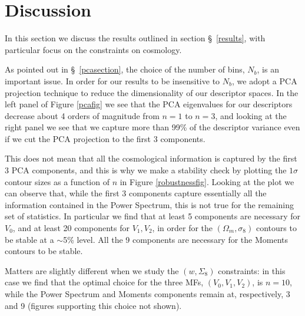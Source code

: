 \documentclass[reprint,aps,prd,superscriptaddress,showkeys,showpacs]{revtex4-1}
\begin{document}


\section{Discussion}
\label{discussion}

In this section we discuss the results outlined in section \S~\ref{results}, with particular focus on the constraints on cosmology. 

As pointed out in \S~\ref{pcasection}, the choice of the number of bins, $N_b$, is an important issue. In order for our results to be insensitive to $N_b$, we adopt a PCA projection technique to reduce the dimensionality of our descriptor spaces. In the left panel of Figure \ref{pcafig} we see that the PCA eigenvalues for our descriptors decrease about 4 orders of magnitude from $n=1$ to $n=3$, and looking at the right panel we see that we capture more than 99\%  of the descriptor variance even if we cut the PCA projection to the first 3 components. 

This does not mean that all the cosmological information is captured by the first 3 PCA components, and this is why we make a stability check by plotting the $1\sigma$ contour sizes as a function of $n$ in Figure \ref{robustnessfig}. Looking at the plot we can observe that, while the first 3 components capture essentially all the information contained in the Power Spectrum, this is not true for the remaining set of statistics. In particular we find that at least 5 components are necessary for $V_0$, and at least 20 components for $V_1,V_2$, in order for the $(\Omega_m,\sigma_8)$ contours to be stable at a $\sim$5\% level. All the 9 components are necessary for the Moments contours to be stable. 

Matters are slightly different when we study the $(w,\Sigma_8)$ constraints: in this case we find that the optimal choice for the three MFs, $(V_0,V_1,V_2)$, is $n=10$, while the Power Spectrum and Moments components remain at, respectively, 3 and 9 (figures supporting this choice not shown).
\end{document}
